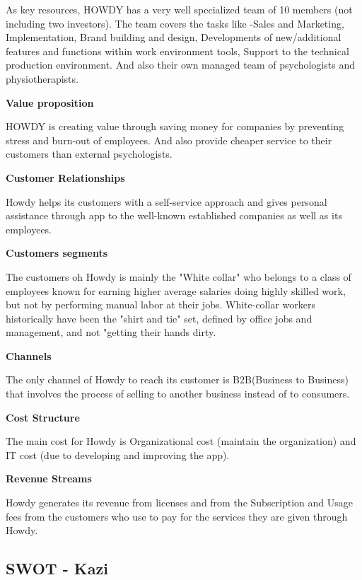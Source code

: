 \noindent As key resources, HOWDY has a very well specialized team of 10 members (not including two investors). The team covers the tasks like -Sales and Marketing, Implementation, Brand building and design, Developments of new/additional features and functions within work environment tools, Support to the technical production environment. And also their own managed team of psychologists and physiotherapists.

\noindent \textbf{Value proposition}

\noindent HOWDY is creating value through saving money for companies by preventing stress and burn-out of employees. And also provide cheaper service to their customers than external psychologists.

\noindent \textbf{Customer Relationships}

\noindent Howdy helps its customers with a self-service approach and gives personal assistance through app to the well-known established companies as well as its employees.

\noindent \textbf{Customers segments}

\noindent The customers oh Howdy is mainly the "White collar" who belongs to a class of employees known for earning higher average salaries doing highly skilled work, but not by performing manual labor at their jobs. White-collar workers historically have been the "shirt and tie" set, defined by office jobs and management, and not "getting their hands dirty.

\noindent \textbf{Channels}

\noindent The only channel of Howdy to reach its customer is B2B(Business to Business) that involves the process of selling to another business instead of to consumers.

\noindent \textbf{Cost Structure}

\noindent The main cost for Howdy is Organizational cost (maintain the organization) and IT cost (due to developing and improving the app).

\noindent \textbf{Revenue Streams}

\noindent Howdy generates its revenue from licenses and from the Subscription and Usage fees from the customers who use to pay for the services they are given through Howdy.



\subsection{SWOT - Kazi}

